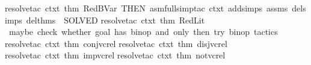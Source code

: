 \begin{isabellebody}
{\isacharparenleft}{\kern0pt}resolve{\isacharunderscore}{\kern0pt}tac\ ctxt\ {\isacharbrackleft}{\kern0pt}{\isacharat}{\kern0pt}{\isacharbraceleft}{\kern0pt}thm\ RedBVar{\isacharbraceright}{\kern0pt}{\isacharbrackright}{\kern0pt}\ THEN{\isacharprime}{\kern0pt}\ {\isacharparenleft}{\kern0pt}asm{\isacharunderscore}{\kern0pt}full{\isacharunderscore}{\kern0pt}simp{\isacharunderscore}{\kern0pt}tac\ {\isacharparenleft}{\kern0pt}ctxt\ addsimps\ assms\ delsimps\ del{\isacharunderscore}{\kern0pt}thms{\isacharparenright}{\kern0pt}\ {\isacharbar}{\kern0pt}{\isachargreater}{\kern0pt}\ SOLVED{\isacharprime}{\kern0pt}{\isacharparenright}{\kern0pt}{\isacharparenright}{\kern0pt}{\isacharcomma}{\kern0pt}\isanewline
{\isacharparenleft}{\kern0pt}resolve{\isacharunderscore}{\kern0pt}tac\ ctxt\ {\isacharbrackleft}{\kern0pt}{\isacharat}{\kern0pt}{\isacharbraceleft}{\kern0pt}thm\ RedLit{\isacharbraceright}{\kern0pt}{\isacharbrackright}{\kern0pt}{\isacharparenright}{\kern0pt}{\isacharcomma}{\kern0pt}\isanewline
{\isacharparenleft}{\kern0pt}{\isacharasterisk}{\kern0pt}\ maybe\ check\ whether\ goal\ has\ binop\ and\ only\ then\ try\ binop\ tactics\ {\isacharasterisk}{\kern0pt}{\isacharparenright}{\kern0pt}\isanewline
{\isacharparenleft}{\kern0pt}resolve{\isacharunderscore}{\kern0pt}tac\ ctxt\ {\isacharbrackleft}{\kern0pt}{\isacharat}{\kern0pt}{\isacharbraceleft}{\kern0pt}thm\ conj{\isacharunderscore}{\kern0pt}vc{\isacharunderscore}{\kern0pt}rel{\isacharbraceright}{\kern0pt}{\isacharbrackright}{\kern0pt}{\isacharparenright}{\kern0pt}{\isacharcomma}{\kern0pt}\isanewline
{\isacharparenleft}{\kern0pt}resolve{\isacharunderscore}{\kern0pt}tac\ ctxt\ {\isacharbrackleft}{\kern0pt}{\isacharat}{\kern0pt}{\isacharbraceleft}{\kern0pt}thm\ disj{\isacharunderscore}{\kern0pt}vc{\isacharunderscore}{\kern0pt}rel{\isacharbraceright}{\kern0pt}{\isacharbrackright}{\kern0pt}{\isacharparenright}{\kern0pt}{\isacharcomma}{\kern0pt}\isanewline
{\isacharparenleft}{\kern0pt}resolve{\isacharunderscore}{\kern0pt}tac\ ctxt\ {\isacharbrackleft}{\kern0pt}{\isacharat}{\kern0pt}{\isacharbraceleft}{\kern0pt}thm\ imp{\isacharunderscore}{\kern0pt}vc{\isacharunderscore}{\kern0pt}rel{\isacharbraceright}{\kern0pt}{\isacharbrackright}{\kern0pt}{\isacharparenright}{\kern0pt}{\isacharcomma}{\kern0pt}\isanewline
{\isacharparenleft}{\kern0pt}resolve{\isacharunderscore}{\kern0pt}tac\ ctxt\ {\isacharbrackleft}{\kern0pt}{\isacharat}{\kern0pt}{\isacharbraceleft}{\kern0pt}thm\ not{\isacharunderscore}{\kern0pt}vc{\isacharunderscore}{\kern0pt}rel{\isacharbraceright}{\kern0pt}{\isacharbrackright}{\kern0pt}{\isacharparenright}{\kern0pt}{\isacharcomma}{\kern0pt}\isanewline

\end{isabellebody}
